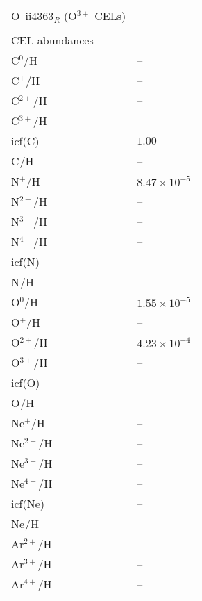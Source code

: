 \begin{longtable}[l]{ll}
 O~{\sc ii}4363$_R$ (O$^{3+}$ CELs)  & -- \\
 \vspace{0.2cm}\\\multicolumn{2}{l}{CEL abundances}\\ \hline
 C$^{0}$/H                           & -- \\
 C$^{+}$/H                           & -- \\
 C$^{2+}$/H                          & -- \\
 C$^{3+}$/H                          & -- \\
 icf(C)                              & $  1.00$\\
 C$^{}$/H                            & -- \\
 N$^{+}$/H                           & $  8.47\times 10^{ -5}$\\
 N$^{2+}$/H                          & -- \\
 N$^{3+}$/H                          & -- \\
 N$^{4+}$/H                          & -- \\
 icf(N)                              & -- \\
 N$^{}$/H                            & -- \\
 O$^{0}$/H                           & $  1.55\times 10^{ -5}$\\
 O$^{+}$/H                           & -- \\
 O$^{2+}$/H                          & $  4.23\times 10^{ -4}$\\
 O$^{3+}$/H                          & -- \\
 icf(O)                              & -- \\
 O$^{}$/H                            & -- \\
 Ne$^{+}$/H                          & -- \\
 Ne$^{2+}$/H                         & -- \\
 Ne$^{3+}$/H                         & -- \\
 Ne$^{4+}$/H                         & -- \\
 icf(Ne)                             & -- \\
 Ne$^{}$/H                           & -- \\
 Ar$^{2+}$/H                         & -- \\
 Ar$^{3+}$/H                         & -- \\
 Ar$^{4+}$/H                         & -- \\

\end{longtable}
